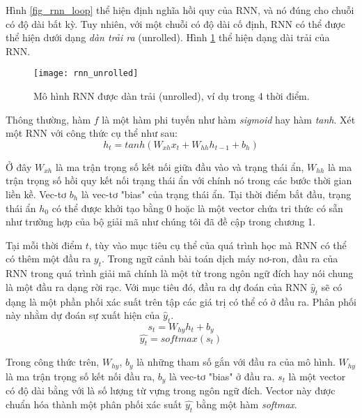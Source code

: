 Hình \ref{fig_rnn_loop} thể hiện định nghĩa hồi quy của RNN, và nó đúng cho chuỗi có độ dài bất kỳ. Tuy nhiên, với một chuỗi có độ dài cố định, RNN có thể được thể hiện dưới dạng \textit{dàn trải ra} (unrolled). Hình \ref{fig_rnn_unrolled} thể hiện dạng dài trải của RNN.

\begin{figure}
	\centering
	\texttt{[image: rnn\_unrolled]}
	\caption[Mô hình RNN dạng dàn trải]{Mô hình RNN được dàn trải (unrolled), ví dụ trong 4 thời điểm.}
	\label{fig_rnn_unrolled}
\end{figure}


Thông thường, hàm $f$ là một hàm phi tuyến như hàm \textit{sigmoid} hay hàm \textit{tanh}. Xét một RNN với công thức cụ thể như sau:
\begin{equation} \label{rnnWithTanh}
	h_t = tanh \left(W_{xh} x_t + W_{hh}h_{t-1} + b_h \right)
\end{equation}

Ở đây $W_{xh}$ là ma trận trọng số kết nối giữa đầu vào và trạng thái ẩn, $W_{hh}$ là ma trận trọng số hồi quy kết nối trạng thái ẩn với chính nó trong các bước thời gian liền kề. Vec-tơ $b_h$ là vec-tơ "bias" của trạng thái ẩn. Tại thời điểm bắt đầu, trạng thái ẩn $h_0$ có thể được khởi tạo bằng 0 hoặc là một vector chứa tri thức có sẵn như trường hợp của bộ giải mã như chúng tôi đã đề cập trong chương 1.

Tại mỗi thời điểm $t$, tùy vào mục tiêu cụ thể của quá trình học mà RNN có thể có thêm một đầu ra $y_t$. Trong ngữ cảnh bài toán dịch máy nơ-ron, đầu ra của RNN trong quá trình giải mã chính là một từ trong ngôn ngữ đích hay nói chung là một đầu ra dạng rời rạc. Với mục tiêu đó, đầu ra dự đoán của RNN $\hat{y}_t$ sẽ có dạng là một phần phối xác suất trên tập các giá trị có thể có ở đầu ra. Phân phối này nhằm dự đoán sự xuất hiện của $\hat{y}_t$.
\begin{equation} \label{rnnOuputSoftmax}
	s_t = W_{hy}h_t + b_y
\end{equation} 
\begin{equation} \label{rnnOuputSoftmaxDistribution}
	\hat{y_t} = softmax(s_t)
\end{equation}

Trong công thức trên, $W_{hy}$, $b_y$ là những tham số gắn với đầu ra của mô hình. $W_{hy}$ là ma trận trọng số kết nối đầu ra, $b_y$ là vec-tơ "bias" ở đầu ra. $s_t$ là một vector có độ dài bằng với là số lượng từ vựng trong ngôn ngữ đích. Vector này được chuẩn hóa thành một phân phối xác suất $\hat{y_t}$ bằng một hàm \textit{softmax}.

